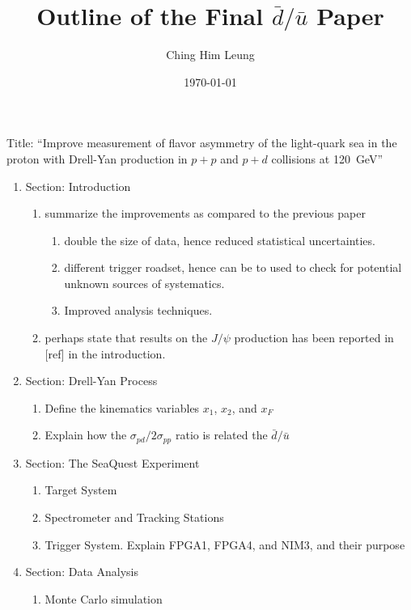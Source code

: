 \documentclass{article}
\title{Outline of the Final $\bar{d}/\bar{u}$ Paper}
\author{Ching Him Leung}
\date{\today}
\begin{document}
\maketitle
Title: ``Improve measurement of flavor asymmetry of the light-quark sea in the proton with Drell-Yan production in
	\texorpdfstring{$p+p$}{p+p} and \texorpdfstring{$p+d$}{p+d} collisions at \texorpdfstring{\SI{120}{\GeV}}{120~GeV}''
\begin{enumerate}
    \item Section: Introduction
    \begin{enumerate}
        \item summarize the improvements as compared to the previous paper
        \begin{enumerate}
            \item double the size of data, hence reduced statistical uncertainties.
            \item different trigger roadset, hence can be to used to check for potential unknown sources of systematics.
            \item Improved analysis techniques.
        \end{enumerate}
        \item perhaps state that results on the $J/\psi$ production has been reported in [ref] in the introduction.
    \end{enumerate} 
    \item Section: Drell-Yan Process
    \begin{enumerate}
        \item Define the kinematics variables $x_1$, $x_2$, and $x_F$
        \item Explain how the $\sigma_{pd}/2\sigma_{pp}$ ratio is related the $\bar{d}/\bar{u}$
    \end{enumerate}
    \item Section: The SeaQuest Experiment
    \begin{enumerate}
        \item Target System
        \item Spectrometer and Tracking Stations
        \item Trigger System. Explain FPGA1, FPGA4, and NIM3, and their purpose
    \end{enumerate}
    \item Section: Data Analysis
    \begin{enumerate}
        \item Monte Carlo simulation
        \begin{itemize}

\end{itemize}
\end{enumerate}
\end{enumerate}
\end{document}
